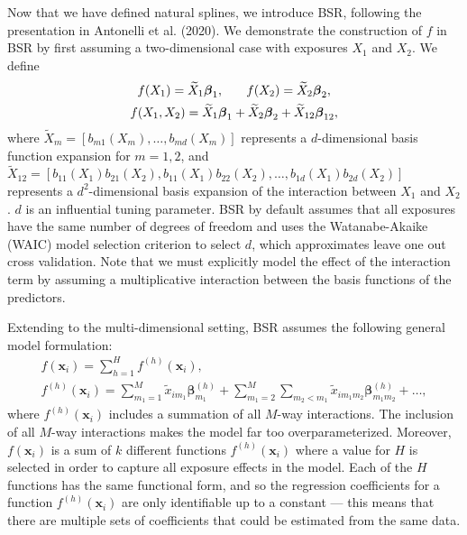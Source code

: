 \documentclass[12pt, twoside]{amherstthesis}
\begin{document}
Now that we have defined natural splines, we introduce BSR, following the presentation in Antonelli et al. (2020). We demonstrate the construction of \(f\) in BSR by first assuming a two-dimensional case with exposures \(X_1\) and \(X_2\). We define
\begin{gather*}
f(X_1) = \widetilde{X}_1\boldsymbol{\beta}_1, \hspace{0.25in} f(X_2) = \widetilde{X}_2\boldsymbol{\beta}_2,\\
f(X_1,X_2) = \widetilde{X}_1\boldsymbol{\beta}_1 + \widetilde{X}_2\boldsymbol{\beta}_2 + \widetilde{X}_{12}\boldsymbol{\beta}_{12},
\end{gather*}
\noindent where \(\widetilde{X}_m=[b_{m1}(X_m),\dots,b_{md}(X_m)]\) represents a \(d\)-dimensional basis function expansion for \(m=1,2\), and \(\widetilde{X}_{12}= [b_{11}(X_1)b_{21}(X_2), b_{11}(X_1)b_{22}(X_2), \dots, b_{1d}(X_1)b_{2d}(X_2)]\) represents a \(d^2\)-dimensional basis expansion of the interaction between \(X_1\) and \(X_2\). \(d\) is an influential tuning parameter. BSR by default assumes that all exposures have the same number of degrees of freedom and uses the Watanabe-Akaike (WAIC) model selection criterion to select \(d\), which approximates leave one out cross validation. Note that we must explicitly model the effect of the interaction term by assuming a multiplicative interaction between the basis functions of the predictors.

Extending to the multi-dimensional setting, BSR assumes the following general model formulation:
\begin{gather*}
f(\textbf{x}_i)= \sum_{h=1}^Hf^{(h)}(\textbf{x}_i), \\
f^{(h)}(\textbf{x}_i)= \sum_{m_1=1}^M\widetilde{x}_{im_1}\boldsymbol\beta_{m_1}^{(h)} + 
\sum_{m_1=2}^M\sum_{m_2<m_1}\widetilde{x}_{im_1m_2}\boldsymbol\beta_{m_1m_2}^{(h)} + \dots,
\end{gather*}
\noindent where \(f^{(h)}(\textbf{x}_i)\) includes a summation of all \(M\)-way interactions. The inclusion of all \(M\)-way interactions makes the model far too overparameterized. Moreover, \(f(\textbf{x}_i)\) is a sum of \(k\) different functions \(f^{(h)}(\textbf{x}_i)\) where a value for \(H\) is selected in order to capture all exposure effects in the model. Each of the \(H\) functions has the same functional form, and so the regression coefficients for a function \(f^{(h)}(\textbf{x}_i)\) are only identifiable up to a constant --- this means that there are multiple sets of coefficients that could be estimated from the same data.
\end{document}
